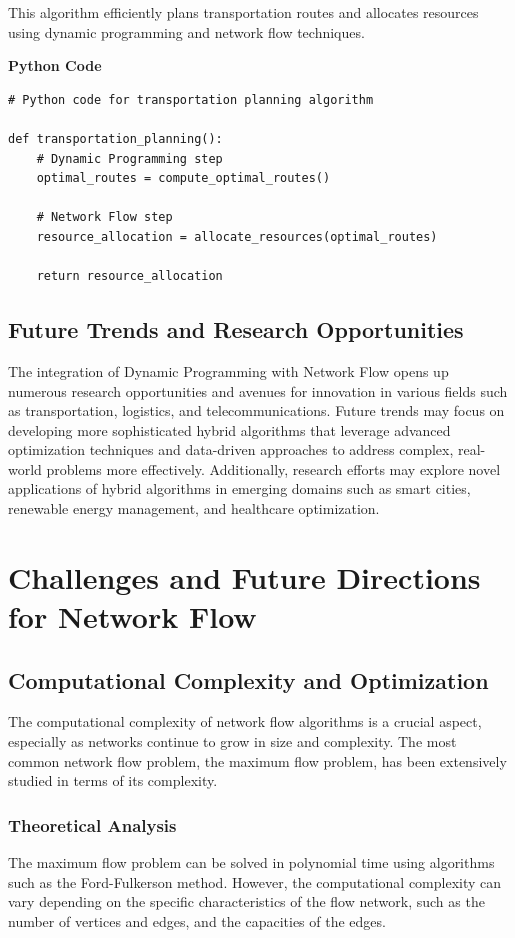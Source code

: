 \documentclass[12pt]{book} %
\begin{document}
This algorithm efficiently plans transportation routes and allocates resources using dynamic programming and network flow techniques.


\textbf{Python Code}

\FloatBarrier
\begin{lstlisting}
# Python code for transportation planning algorithm

def transportation_planning():
    # Dynamic Programming step
    optimal_routes = compute_optimal_routes()
    
    # Network Flow step
    resource_allocation = allocate_resources(optimal_routes)
    
    return resource_allocation
\end{lstlisting}
\FloatBarrier

\subsection{Future Trends and Research Opportunities}

The integration of Dynamic Programming with Network Flow opens up numerous research opportunities and avenues for innovation in various fields such as transportation, logistics, and telecommunications. Future trends may focus on developing more sophisticated hybrid algorithms that leverage advanced optimization techniques and data-driven approaches to address complex, real-world problems more effectively. Additionally, research efforts may explore novel applications of hybrid algorithms in emerging domains such as smart cities, renewable energy management, and healthcare optimization.


\section{Challenges and Future Directions for Network Flow}

\subsection{Computational Complexity and Optimization}
The computational complexity of network flow algorithms is a crucial aspect, especially as networks continue to grow in size and complexity. The most common network flow problem, the maximum flow problem, has been extensively studied in terms of its complexity.

\subsubsection{Theoretical Analysis}
The maximum flow problem can be solved in polynomial time using algorithms such as the Ford-Fulkerson method. However, the computational complexity can vary depending on the specific characteristics of the flow network, such as the number of vertices and edges, and the capacities of the edges.
\end{document}
